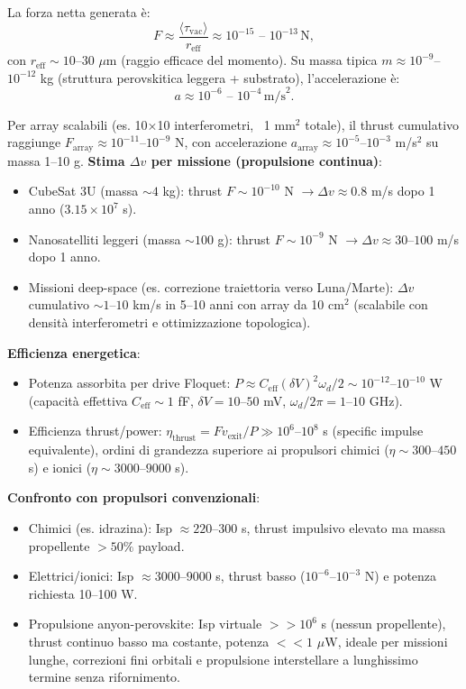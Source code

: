 \documentclass[11pt,a4paper]{article}
\theoremstyle{plain}
\theoremstyle{definition}
\begin{document}
La forza netta generata è:
\begin{equation}
F \approx \frac{\langle \tau_{\text{vac}} \rangle}{r_{\text{eff}}} \approx 10^{-15} \text{ -- } 10^{-13} \, \text{N},
\end{equation}
con $r_{\text{eff}} \sim 10$--$30$ $\mu$m (raggio efficace del momento). Su massa tipica $m \approx 10^{-9}$–$10^{-12}$ kg (struttura perovskitica leggera + substrato), l'accelerazione è:
\begin{equation}
a \approx 10^{-6} \text{ -- } 10^{-4} \, \text{m/s}^2.
\end{equation}

Per array scalabili (es. 10×10 interferometri, ~1 mm$^2$ totale), il thrust cumulativo raggiunge $F_{\text{array}} \approx 10^{-11}$–$10^{-9}$ N, con accelerazione $a_{\text{array}} \approx 10^{-5}$–$10^{-3}$ m/s$^2$ su massa 1–10 g.
\vspace{0.2cm}
\textbf{Stima $\Delta v$ per missione (propulsione continua)}:
\begin{itemize}
    \item CubeSat 3U (massa $\sim 4$ kg): thrust $F \sim 10^{-10}$ N $\to \Delta v \approx 0.8$ m/s dopo 1 anno ($3.15 \times 10^7$ s).
    \item Nanosatelliti leggeri (massa $\sim 100$ g): thrust $F \sim 10^{-9}$ N $\to \Delta v \approx 30$--$100$ m/s dopo 1 anno.
    \item Missioni deep-space (es. correzione traiettoria verso Luna/Marte): $\Delta v$ cumulativo $\sim 1$--$10$ km/s in 5--10 anni con array da 10 cm$^2$ (scalabile con densità interferometri e ottimizzazione topologica).
\end{itemize}

\textbf{Efficienza energetica}:
\begin{itemize}
    \item Potenza assorbita per drive Floquet: $P \approx C_{\text{eff}} (\delta V)^2 \omega_d / 2 \sim 10^{-12}$--$10^{-10}$ W (capacità effettiva $C_{\text{eff}} \sim 1$ fF, $\delta V = 10$--$50$ mV, $\omega_d / 2\pi = 1$--$10$ GHz).
    \item Efficienza thrust/power: $\eta_{\text{thrust}} = F v_{\text{exit}} / P \gg 10^6$--$10^8$ s (specific impulse equivalente), ordini di grandezza superiore ai propulsori chimici ($\eta \sim 300$--$450$ s) e ionici ($\eta \sim 3000$--$9000$ s).
\end{itemize}

\textbf{Confronto con propulsori convenzionali}:
\begin{itemize}
    \item Chimici (es. idrazina): Isp $\approx 220$--$300$ s, thrust impulsivo elevato ma massa propellente $>50\%$ payload.
    \item Elettrici/ionici: Isp $\approx 3000$--$9000$ s, thrust basso ($10^{-6}$--$10^{-3}$ N) e potenza richiesta 10--100 W.
    \item Propulsione anyon-perovskite: Isp virtuale $>>10^6$ s (nessun propellente), thrust continuo basso ma costante, potenza $<<1$ $\mu$W, ideale per missioni lunghe, correzioni fini orbitali e propulsione interstellare a lunghissimo termine senza rifornimento.
\end{itemize}
\end{document}
